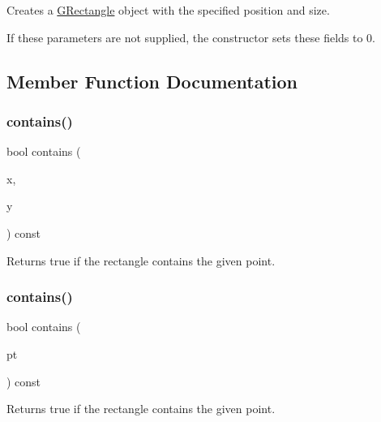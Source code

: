 Creates a {\ttfamily \mbox{\hyperlink{structGRectangle}{G\+Rectangle}}} object with the specified position and size. 

If these parameters are not supplied, the constructor sets these fields to 0. 

\subsection{Member Function Documentation}
\mbox{\label{structGRectangle_abb6a5d7c03e6eaaae97264c4799ce7c3}} 
\subsubsection{\texorpdfstring{contains()}{contains()}\hspace{0.1cm}{\footnotesize\ttfamily [1/3]}}
{\footnotesize\ttfamily bool contains (\begin{DoxyParamCaption}\item[{double}]{x,  }\item[{double}]{y }\end{DoxyParamCaption}) const}



Returns {\ttfamily true} if the rectangle contains the given point. 

\mbox{\label{structGRectangle_a1dbc9dafaae51958112dbe1267a1f547}} 
\subsubsection{\texorpdfstring{contains()}{contains()}\hspace{0.1cm}{\footnotesize\ttfamily [2/3]}}
{\footnotesize\ttfamily bool contains (\begin{DoxyParamCaption}\item[{const \mbox{\hyperlink{structGPoint}{G\+Point}} \&}]{pt }\end{DoxyParamCaption}) const}



Returns {\ttfamily true} if the rectangle contains the given point. 

\mbox{\label{structGRectangle_a5e2ef5fc6df7e73cd949c042ba2ffcf7}} 
